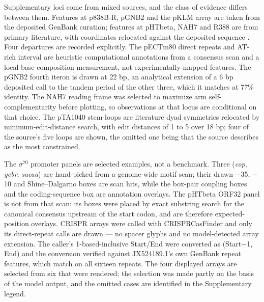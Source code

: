 Supplementary loci come from mixed sources, and the class of evidence differs
between them. Features at p838B-R, pGNB2 and the pKLM array are taken from
the deposited GenBank curation; features at pHTbeta, NAH7 and R388 are from
primary literature, with coordinates relocated against the deposited
sequence \cite{tomita2005genetic,kishida2017host,llosa1991structural}.
Four departures are recorded explicitly. The pECTm80 direct repeats and
AT-rich interval are heuristic computational annotations from a consensus
scan and a local base-composition measurement, not experimentally mapped
features. The pGNB2 fourth iteron is drawn at 22 bp, an analytical extension
of a 6 bp deposited call to the tandem period of the other three, which it
matches at 77\% identity. The NAH7 reading frame was selected to maximize arm
self-complementarity before plotting, so observations at that locus are
conditional on that choice. The pTA1040 stem-loops are literature dyad
symmetries relocated by minimum-edit-distance search, with edit distances of
1 to 5 over 18 bp; four of the source's five loops are shown, the omitted one
being that the source describes as the most constrained.

The $\sigma^{70}$ promoter panels are selected examples, not a benchmark.
Three (\emph{cop}, \emph{ycbr}, \emph{sacaa}) are hand-picked from a
genome-wide motif scan; their drawn $-$35, $-$10 and Shine--Dalgarno boxes
are scan hits, while the box-pair coupling boxes and the coding-sequence box
are annotation overlays. The pHTbeta ORF32 panel is not from that scan: its
boxes were placed by exact substring search for the canonical consensus
upstream of the start codon, and are therefore expected-position overlays.
CRISPR arrays were called with CRISPRCasFinder
\cite{couvin2018crisprcasfinder}
and only its direct-repeat calls are drawn --- no spacer glyphs and no
model-detected array extension. The caller's 1-based-inclusive Start/End were
converted as (Start$-$1, End) and the conversion verified against
JX524189.1's own GenBank repeat features, which match on all sixteen repeats.
The four displayed arrays are selected from six that were rendered; the
selection was made partly on the basis of the model output, and the omitted
cases are identified in the Supplementary legend.

